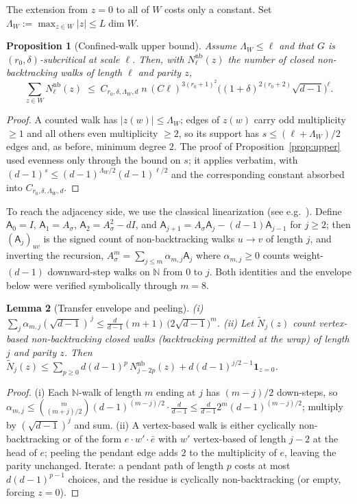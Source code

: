 \documentclass[11pt]{article}
\newtheorem{lemma}{Lemma}
\newtheorem{proposition}[lemma]{Proposition}
\theoremstyle{remark}
\begin{document}
The extension from $z=0$ to all of $W$ costs only a constant. Set
$\Lambda_W:=\max_{z\in W}|z|\le L\dim W$.

\begin{proposition}[Confined-walk upper bound]\label{prop:confined}
Assume $\Lambda_W\le\ell$ and that $G$ is
$(r_0,\delta)$-subcritical at scale $\ell$. Then, with
$N^{\mathrm{nb}}_\ell(z)$ the number of closed non-backtracking walks
of length $\ell$ and parity $z$,
\[
\sum_{z\in W}N^{\mathrm{nb}}_\ell(z)\;\le\;
C_{r_0,\delta,\Lambda_W,d}\;n\,(C\ell)^{3(r_0+1)^2}
\big((1+\delta)^{2(r_0+2)}\sqrt{d-1}\big)^{\ell}.
\]
\end{proposition}

\begin{proof}
A counted walk has $|z(w)|\le\Lambda_W$; edges of $z(w)$ carry odd
multiplicity $\ge1$ and all others even multiplicity $\ge2$, so its
support has $s\le(\ell+\Lambda_W)/2$ edges and, as before, minimum
degree $2$. The proof of Proposition~\ref{prop:upper} used evenness
only through the bound on $s$; it applies verbatim, with
$(d-1)^{s}\le(d-1)^{\Lambda_W/2}(d-1)^{\ell/2}$ and the corresponding
constant absorbed into $C_{r_0,\delta,\Lambda_W,d}$.
\end{proof}

To reach the adjacency side, we use the classical linearization (see
e.g.\ \cite{bordenave20}). Define $\mathsf A_0=I$,
$\mathsf A_1=A_\sigma$, $\mathsf A_2=A_\sigma^2-dI$, and
$\mathsf A_{j+1}=A_\sigma\mathsf A_j-(d-1)\mathsf A_{j-1}$ for
$j\ge2$; then $(\mathsf A_j)_{uv}$ is the signed count of
non-backtracking walks $u\to v$ of length $j$, and inverting the
recursion,
$A_\sigma^{m}=\sum_{j\le m}\alpha_{m,j}\mathsf A_j$ where
$\alpha_{m,j}\ge0$ counts weight-$(d-1)$ downward-step walks on
$\mathbb N$ from $0$ to $j$. Both identities and the envelope below
were verified symbolically through $m=8$.

\begin{lemma}[Transfer envelope and peeling]\label{lem:transfer}
(i) $\sum_j\alpha_{m,j}(\sqrt{d-1})^{\,j}\le
\tfrac{d}{d-1}(m+1)\,\big(2\sqrt{d-1}\big)^{m}$.
(ii) Let $\widetilde N_j(z)$ count vertex-based non-backtracking closed
walks (backtracking permitted at the wrap) of length $j$ and parity
$z$. Then
$\widetilde N_j(z)\le\sum_{p\ge0}d(d-1)^{p}\,
N^{\mathrm{nb}}_{j-2p}(z)+d(d-1)^{j/2-1}\mathbf 1_{z=0}$.
\end{lemma}

\begin{proof}
(i) Each $\mathbb N$-walk of length $m$ ending at $j$ has $(m-j)/2$
down-steps, so $\alpha_{m,j}\le\binom{m}{(m+j)/2}(d-1)^{(m-j)/2}\cdot
\tfrac d{d-1}\le\tfrac d{d-1}2^m(d-1)^{(m-j)/2}$; multiply by
$(\sqrt{d-1})^j$ and sum. (ii) A vertex-based walk is either
cyclically non-backtracking or of the form $e\cdot w'\cdot\bar e$ with
$w'$ vertex-based of length $j-2$ at the head of $e$; peeling the
pendant edge adds $2$ to the multiplicity of $e$, leaving the parity
unchanged. Iterate: a pendant path of length $p$ costs at most
$d(d-1)^{p-1}$ choices, and the residue is cyclically non-backtracking
(or empty, forcing $z=0$).
\end{proof}
\end{document}
